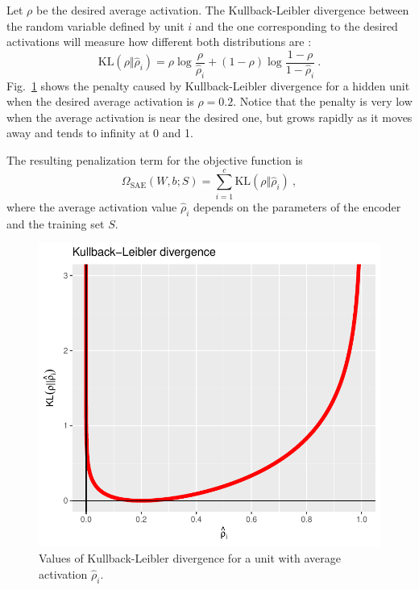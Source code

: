 Let $\rho$ be the desired average activation. The Kullback-Leibler divergence  between the random variable defined by unit $i$ and the one corresponding to the desired activations will measure how different both distributions are :
\begin{equation}\label{p1Eq.KLdivergence}
  \mathrm{KL}(\rho\Vert \hat\rho_i)=\rho \log\frac\rho{\hat\rho_i} + (1 - \rho)\log\frac{1 - \rho}{1 - \hat\rho_i}~.
\end{equation}
Fig.~\ref{p1Fig.KLdivergence} shows the penalty caused by Kullback-Leibler divergence for a hidden unit when the desired average activation is $\rho=0.2$. Notice that the penalty is very low when the average activation is near the desired one, but grows rapidly as it moves away and tends to infinity at 0 and 1.

The resulting penalization term for the objective function is
\begin{equation}
  \Omega_{\mathrm{SAE}}(W,b;S)=\sum_{i=1}^c \mathrm{KL}(\rho\Vert \hat\rho_i)~,
\end{equation}
where the average activation value $\hat\rho_i$ depends on the parameters of the encoder and the training set $S$.

\begin{figure}[ht!]
	\centering
	\includegraphics[width=0.9\linewidth]{kldivergence.pdf} 

	\caption{Values of Kullback-Leibler divergence for a unit with average activation $\hat\rho_i$.}
	\label{p1Fig.KLdivergence}
\end{figure}



